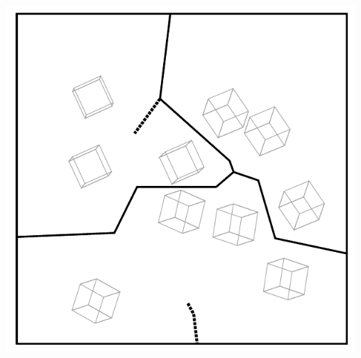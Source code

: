 \begin{frame}[fragile]
\begin{overprint}
\begin{center}
\includegraphics[height=0.9\textheight]{fig/voronoi-iom-f}
\par\end{center}

\end{overprint}

\end{frame}


